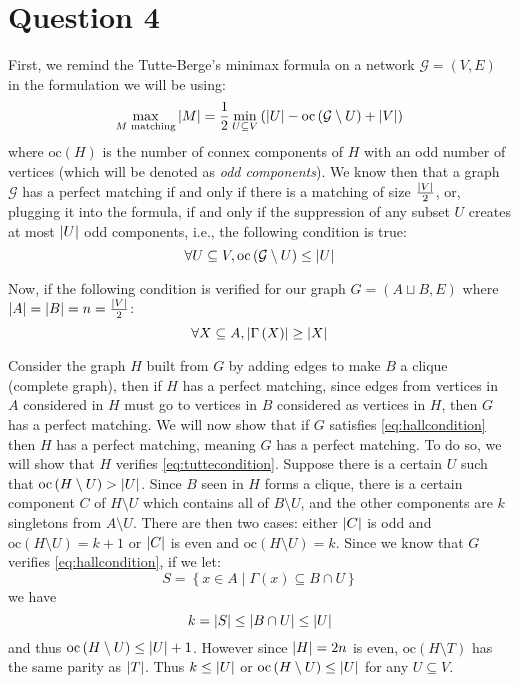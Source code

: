 \documentclass[math]{cours}
\def\oc{\mathrm{oc}}
\begin{document}
\section{Question 4}
First, we remind the Tutte-Berge's minimax formula on a network $\mathcal{G} = \left(V, E\right)$ in the formulation we will be using:
\begin{equation}
	\max_{M \text{ matching}} \abs{M} = \frac{1}{2}\min_{U \subseteq V} \left(\abs{U} - \oc\left(\mathcal{G} \setminus U\right) + \abs{V} \right)
\end{equation}
where $\oc(H)$ is the number of connex components of $H$ with an odd number of vertices (which will be denoted as \emph{odd components}).
We know then that a graph $\mathcal{G}$ has a perfect matching if and only if there is a matching of size $\frac{\left|V\right|}{2}$, or, plugging it into the formula, if and only if the suppression of any subset $U$ creates at most $\left|U\right|$ odd components, i.e., the following condition is true:
\begin{equation}
	\label{eq:tuttecondition}
	\forall U \subseteq V, \oc\left(\mathcal{G} \setminus U\right) \leq \abs{U}
\end{equation}

Now, if the following condition is verified for our graph $G = \left(A\sqcup B, E\right)$ where $\left|A\right| = \left|B\right| = n = \frac{\left|V\right|}{2}$:
\begin{equation}
	\forall X \subseteq A, \left|\Gamma\left(X\right)\right| \geq \left|X\right|
	\label{eq:hallcondition}
\end{equation}

Consider the graph $H$ built from $G$ by adding edges to make $B$ a clique (complete graph), then if $H$ has a perfect matching, since edges from vertices in $A$ considered in $H$ must go to vertices in $B$ considered as vertices in $H$, then $G$ has a perfect matching.
We will now show that if $G$ satisfies \ref{eq:hallcondition} then $H$ has a perfect matching, meaning $G$ has a perfect matching.
To do so, we will show that $H$ verifies \ref{eq:tuttecondition}. Suppose there is a certain $U$ such that $\oc\left(H \setminus U\right) > \abs{U}$.
Since $B$ seen in $H$ forms a clique, there is a certain component $C$ of $H \setminus U$ which contains all of $B \setminus U$, and the other components are $k$ singletons from $A \setminus U$.
There are then two cases: either $\left|C\right|$ is odd and $\oc\left(H \setminus U\right) = k + 1$ or $\left|C\right|$ is even and $\oc\left(H \setminus U\right) = k$.
Since we know that $G$ verifies \ref{eq:hallcondition}, if we let:
\begin{equation*}
	S = \left\{x \in A\mid \Gamma(x) \subseteq B \cap U \right\}
\end{equation*}
we have
\begin{equation*}
	k = \left|S\right| \leq \left|B \cap U\right| \leq \left|U\right|
\end{equation*}
and thus $\oc\left(H \setminus U \right) \leq \abs{U} + 1$.
However since $\left|H\right| = 2n$ is even, $\oc\left(H \setminus T \right)$ has the same parity as $\left|T\right|$.
Thus $k \leq \left|U\right|$ or $\oc\left(H \setminus U \right) \leq \abs{U}$ for any $U \subseteq V$.
\end{document}
